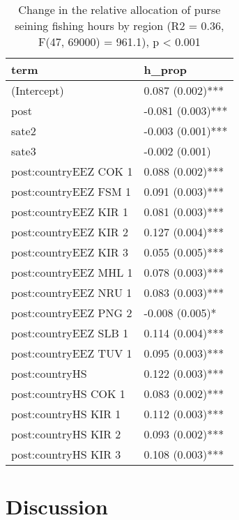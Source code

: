 \documentclass[11pt,]{article}
\begin{document}
\begin{table}[H]

\caption{\label{tab:unnamed-chunk-17}Change in the relative allocation of purse seining fishing hours by region (R2 = 0.36, F(47, 69000) = 961.1), p < 0.001}
\centering
\begin{tabular}[t]{ll}
\toprule
term & h\_prop\\
\midrule
(Intercept) & 0.087 (0.002)***\\
post & -0.081 (0.003)***\\
sate2 & -0.003 (0.001)***\\
sate3 & -0.002 (0.001)\\
post:countryEEZ COK 1 & 0.088 (0.002)***\\
\addlinespace
post:countryEEZ FSM 1 & 0.091 (0.003)***\\
post:countryEEZ KIR 1 & 0.081 (0.003)***\\
post:countryEEZ KIR 2 & 0.127 (0.004)***\\
post:countryEEZ KIR 3 & 0.055 (0.005)***\\
post:countryEEZ MHL 1 & 0.078 (0.003)***\\
\addlinespace
post:countryEEZ NRU 1 & 0.083 (0.003)***\\
post:countryEEZ PNG 2 & -0.008 (0.005)*\\
post:countryEEZ SLB 1 & 0.114 (0.004)***\\
post:countryEEZ TUV 1 & 0.095 (0.003)***\\
post:countryHS & 0.122 (0.003)***\\
\addlinespace
post:countryHS COK 1 & 0.083 (0.002)***\\
post:countryHS KIR 1 & 0.112 (0.003)***\\
post:countryHS KIR 2 & 0.093 (0.002)***\\
post:countryHS KIR 3 & 0.108 (0.003)***\\
\bottomrule
\end{tabular}
\end{table}

\clearpage

\hypertarget{discussion}{%
\section{Discussion}\label{discussion}}
\end{document}
